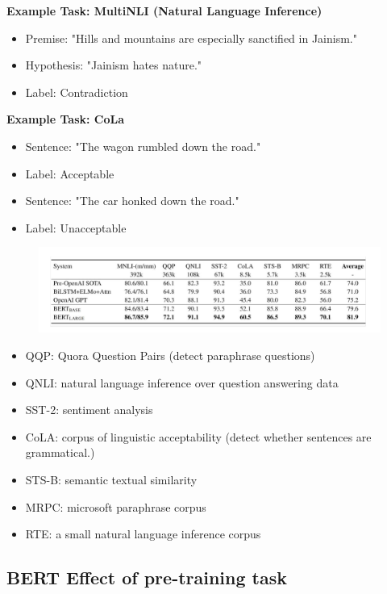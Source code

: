 \textbf{Example Task: MultiNLI (Natural Language Inference)}
\begin{itemize}
\item Premise: "Hills and mountains are especially sanctified in Jainism."
\item Hypothesis: "Jainism hates nature."
\item Label: Contradiction
\end{itemize}

\textbf{Example Task: CoLa}
\begin{itemize}
\item Sentence: "The wagon rumbled down the road."
\item Label: Acceptable
\end{itemize}
\begin{itemize}
\item Sentence: "The car honked down the road."
\item Label: Unacceptable
\end{itemize}

 \begin{figure}[h]
        	\includegraphics[scale = 0.26]{pics/BERTGLUE.png}
        \end{figure}  


\begin{itemize}
\item QQP: Quora Question Pairs (detect paraphrase questions)
\item QNLI: natural language inference over question answering data
\item SST-2: sentiment analysis 
\item CoLA: corpus of linguistic acceptability (detect whether sentences are grammatical.)
\item STS-B: semantic textual similarity
\item MRPC: microsoft paraphrase corpus
\item  RTE: a small natural language inference corpus
\end{itemize}



\subsection{BERT Effect of pre-training task}


